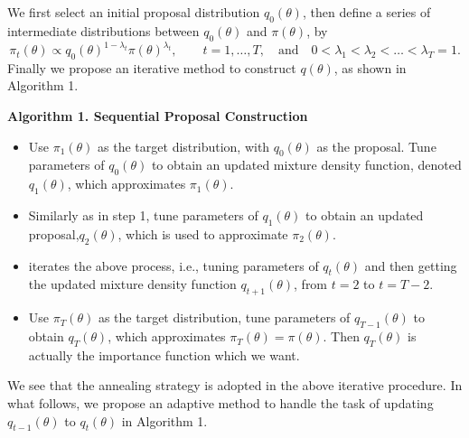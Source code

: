 \documentclass[aoas]{imsart}
\begin{document}
We first select an initial proposal distribution $q_0(\theta)$, then
define a series of intermediate distributions between $q_0(\theta)$
and $\pi(\theta)$, by
\begin{equation}
\pi_t(\theta)\propto
q_0(\theta)^{1-\lambda_t}\pi(\theta)^{\lambda_t}, \quad\quad
t=1,\ldots,T, \quad \mbox{and}\quad
0<\lambda_1<\lambda_2<\dots<\lambda_T=1.
\end{equation}
Finally we propose an iterative method to construct $q(\theta)$, as
shown in Algorithm 1.
\begin{center}
\textbf{Algorithm 1. Sequential Proposal Construction}
\end{center}
\begin{itemize}
\item Use $\pi_1(\theta)$ as the target distribution, with $q_0(\theta)$
as the proposal. Tune parameters of $q_0(\theta)$ to obtain an
updated mixture density function, denoted $q_1(\theta)$, which
approximates $\pi_1(\theta)$.
\item Similarly as in step 1, tune parameters of $q_1(\theta)$ to
obtain an updated proposal,$q_2(\theta)$, which is used to
approximate $\pi_2(\theta)$.
\item iterates the above process, i.e., tuning parameters of $q_t(\theta)$ and then getting the updated mixture density function $q_{t+1}(\theta)$, from $t=2$ to $t=T-2$.
\item Use $\pi_T(\theta)$ as the target distribution, tune parameters of
$q_{T-1}(\theta)$ to obtain $q_{T}(\theta)$, which approximates
$\pi_T(\theta)=\pi(\theta)$. Then $q_{T}(\theta)$ is actually the
importance function which we want.
\end{itemize}

We see that the annealing strategy is adopted in the above iterative
procedure. In what follows, we propose an adaptive method to handle
the task of updating $q_{t-1}(\theta)$ to $q_{t}(\theta)$ in
Algorithm 1.
\end{document}
